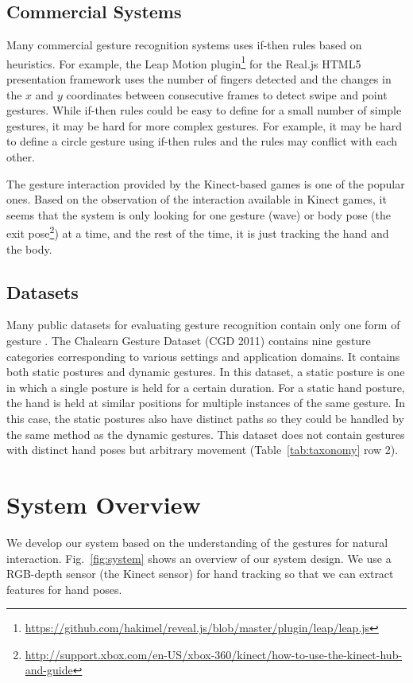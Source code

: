 \subsection{Commercial Systems}
Many commercial gesture recognition systems uses if-then rules based on
heuristics. For example, the Leap Motion
plugin\footnote{\url{https://github.com/hakimel/reveal.js/blob/master/plugin/leap/leap.js}} for the Real.js HTML5 presentation
 framework uses the number of fingers
detected and the changes in the $x$ and $y$ coordinates between consecutive
frames to detect swipe and point gestures. While if-then rules could be easy to define for
a small number of simple gestures, it may be hard for more complex gestures.
For example, it may be hard to define a circle gesture using if-then rules and
the rules may conflict with each other.

The gesture interaction provided by the Kinect-based games is
one of the popular ones. Based on the observation of the interaction
available in Kinect games, it seems that the system is only looking for one
gesture (wave) or body pose (the exit
pose\footnote{\url{http://support.xbox.com/en-US/xbox-360/kinect/how-to-use-the-kinect-hub-and-guide}}) at a time, and the rest of the time, 
it is just tracking the hand and the body.

\subsection{Datasets}
Many public datasets for evaluating gesture recognition contain only one form
of gesture \cite{Song11, Ruffieux2013, marcel99}. The Chalearn Gesture Dataset (CGD
2011) \cite{guyon13} contains nine gesture categories corresponding to various settings and application domains.
 It contains both static postures and dynamic gestures. In this dataset, a static
posture is one in which a single posture is held for a certain duration. For a
static hand posture, the hand is held at similar positions for multiple
instances of the same gesture. In this case, the static postures also have
distinct paths so they could be handled by the same method as the dynamic
gestures.
This dataset does not contain gestures with distinct hand poses but arbitrary movement
(Table~\ref{tab:taxonomy} row 2).

\section{System Overview}
We develop our system based on the understanding of the gestures for
natural interaction. Fig.~\ref{fig:system} shows an overview of our system
design.
We use a RGB-depth sensor (the Kinect sensor) for hand tracking so that we can extract
features for hand poses.

